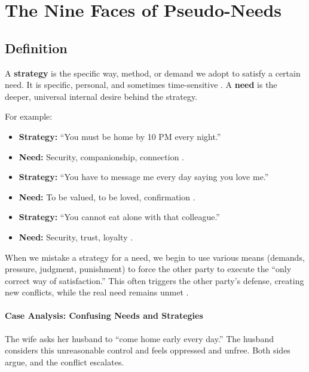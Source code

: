 \section{The Nine Faces of Pseudo-Needs}

\subsection{Definition}
A \textbf{strategy} is the specific way, method, or demand we adopt to
satisfy a certain need.
It is specific, personal, and sometimes time-sensitive \citep{gordon1970}.
A \textbf{need} is the deeper, universal internal desire behind the strategy.

For example:
\begin{itemize}
    \item \textbf{Strategy:} ``You must be home by 10 PM every night.''
    \item \textbf{Need:} Security, companionship, connection \citep{kabatzinn1990}.
\end{itemize}

\begin{itemize}
    \item \textbf{Strategy:} ``You have to message me every day saying you
    love me.''
    \item \textbf{Need:} To be valued, to be loved, confirmation \citep{brown2012}.
\end{itemize}

\begin{itemize}
    \item \textbf{Strategy:} ``You cannot eat alone with that colleague.''
    \item \textbf{Need:} Security, trust, loyalty \citep{kohn2005}.
\end{itemize}

When we mistake a strategy for a need, we begin to use various means
(demands, pressure, judgment, punishment) to force the other party to
execute the ``only correct way of satisfaction.''
This often triggers the other party's defense, creating new conflicts,
while the real need remains unmet \citep{faber1980}.

\paragraph{Case Analysis: Confusing Needs and Strategies}

The wife asks her husband to ``come home early every day.''
The husband considers this unreasonable control and feels oppressed and
unfree.
Both sides argue, and the conflict escalates.

